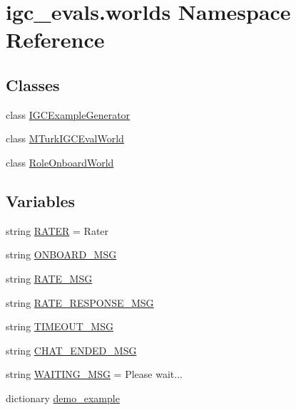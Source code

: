 \hypertarget{namespaceigc__evals_1_1worlds}{}\section{igc\+\_\+evals.\+worlds Namespace Reference}
\label{namespaceigc__evals_1_1worlds}
\subsection*{Classes}
\begin{DoxyCompactItemize}
\item 
class \hyperlink{classigc__evals_1_1worlds_1_1IGCExampleGenerator}{I\+G\+C\+Example\+Generator}
\item 
class \hyperlink{classigc__evals_1_1worlds_1_1MTurkIGCEvalWorld}{M\+Turk\+I\+G\+C\+Eval\+World}
\item 
class \hyperlink{classigc__evals_1_1worlds_1_1RoleOnboardWorld}{Role\+Onboard\+World}
\end{DoxyCompactItemize}
\subsection*{Variables}
\begin{DoxyCompactItemize}
\item 
string \hyperlink{namespaceigc__evals_1_1worlds_a6621760cfa1df3bc36a783ba4feecf33}{R\+A\+T\+ER} = \textquotesingle{}Rater\textquotesingle{}
\item 
string \hyperlink{namespaceigc__evals_1_1worlds_a00b7c310f5d42cfd2a0f4efe4797fed9}{O\+N\+B\+O\+A\+R\+D\+\_\+\+M\+SG}
\item 
string \hyperlink{namespaceigc__evals_1_1worlds_a7c258f12cbeeba1890e94f560a4d9ea5}{R\+A\+T\+E\+\_\+\+M\+SG}
\item 
string \hyperlink{namespaceigc__evals_1_1worlds_a636a949f86f1ea5febabe8bf4e744e82}{R\+A\+T\+E\+\_\+\+R\+E\+S\+P\+O\+N\+S\+E\+\_\+\+M\+SG}
\item 
string \hyperlink{namespaceigc__evals_1_1worlds_ac83aec39d32ea66b10e3e623bc3a7d19}{T\+I\+M\+E\+O\+U\+T\+\_\+\+M\+SG}
\item 
string \hyperlink{namespaceigc__evals_1_1worlds_a8aebbb7ac60c28b9bef3856df7f7e3f3}{C\+H\+A\+T\+\_\+\+E\+N\+D\+E\+D\+\_\+\+M\+SG}
\item 
string \hyperlink{namespaceigc__evals_1_1worlds_a76b4576e14898ef76af46c094e4d9a30}{W\+A\+I\+T\+I\+N\+G\+\_\+\+M\+SG} = \textquotesingle{}Please wait...\textquotesingle{}
\item 
dictionary \hyperlink{namespaceigc__evals_1_1worlds_aba6e8d2d313654e091b536802175a768}{demo\+\_\+example}
\end{DoxyCompactItemize}


